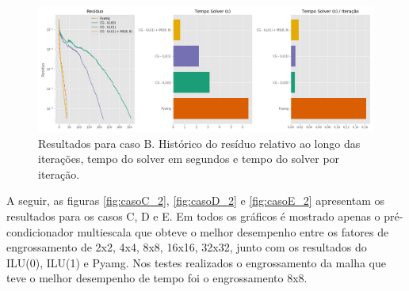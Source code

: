 \begin{figure}[!htbp]
\centering
\includegraphics[width=\textwidth]{chap08/figs/reservatorio320x320_2.png}
\caption{Resultados para caso B. Histórico do resíduo relativo ao longo das iterações, tempo do solver em segundos e tempo do solver por iteração. }
\label{fig:reservatorio320x320_2}
\end{figure}


A seguir, as figuras \ref{fig:casoC_2}, \ref{fig:casoD_2} e \ref{fig:casoE_2} apresentam os resultados para os casos C, D e E. 
Em todos os gráficos é mostrado apenas o pré-condicionador multiescala que obteve o melhor desempenho entre os fatores de engrossamento de 2x2, 4x4, 8x8, 16x16, 32x32,  junto com os resultados do ILU(0), ILU(1) e Pyamg. Nos testes realizados o engrossamento da malha que teve o melhor desempenho de tempo foi o engrossamento 8x8.




